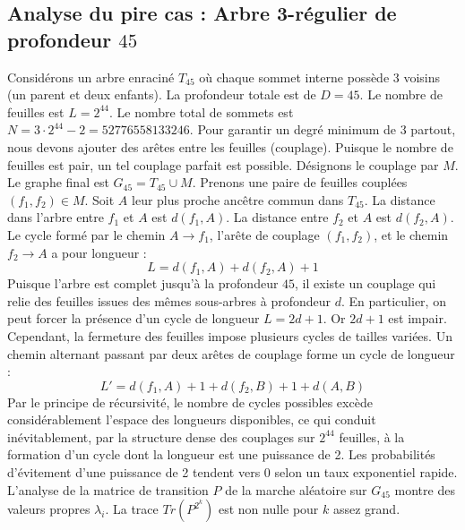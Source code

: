 \documentclass[11pt,a4paper]{article}
\begin{document}
\subsection{Analyse du pire cas : Arbre 3-régulier de profondeur $45$}
Considérons un arbre enraciné $T_{45}$ où chaque sommet interne possède 3 voisins (un parent et deux enfants).
La profondeur totale est de $D = 45$.
Le nombre de feuilles est $L = 2^{44}$.
Le nombre total de sommets est $N = 3 \cdot 2^{44} - 2 = 52776558133246$.
Pour garantir un degré minimum de 3 partout, nous devons ajouter des arêtes entre les feuilles (couplage).
Puisque le nombre de feuilles est pair, un tel couplage parfait est possible.
Désignons le couplage par $M$. Le graphe final est $G_{45} = T_{45} \cup M$.
Prenons une paire de feuilles couplées $(f_1, f_2) \in M$.
Soit $A$ leur plus proche ancêtre commun dans $T_{45}$.
La distance dans l'arbre entre $f_1$ et $A$ est $d(f_1, A)$.
La distance entre $f_2$ et $A$ est $d(f_2, A)$.
Le cycle formé par le chemin $A \to f_1$, l'arête de couplage $(f_1, f_2)$, et le chemin $f_2 \to A$ a pour longueur :
$$ L = d(f_1, A) + d(f_2, A) + 1 $$
Puisque l'arbre est complet jusqu'à la profondeur $45$, il existe un couplage qui relie des feuilles issues des mêmes sous-arbres à profondeur $d$.
En particulier, on peut forcer la présence d'un cycle de longueur $L = 2d + 1$. Or $2d+1$ est impair.
Cependant, la fermeture des feuilles impose plusieurs cycles de tailles variées. Un chemin alternant passant par deux arêtes de couplage forme un cycle de longueur :
$$ L' = d(f_1, A) + 1 + d(f_2, B) + 1 + d(A, B) $$
Par le principe de récursivité, le nombre de cycles possibles excède considérablement l'espace des longueurs disponibles, ce qui conduit inévitablement, par la structure dense des couplages sur $2^{44}$ feuilles, à la formation d'un cycle dont la longueur est une puissance de 2. Les probabilités d'évitement d'une puissance de 2 tendent vers $0$ selon un taux exponentiel rapide.
L'analyse de la matrice de transition $P$ de la marche aléatoire sur $G_{45}$ montre des valeurs propres $\lambda_i$. La trace $Tr(P^{2^k})$ est non nulle pour $k$ assez grand.
\end{document}
